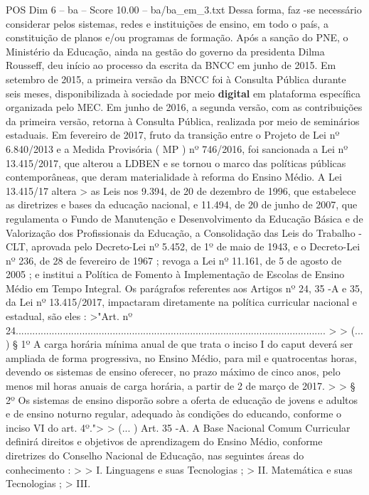 \begin{textsample}{POS Dim 6 – ba – Score 10.00 – ba/ba\_em\_3.txt}
Dessa forma, faz -se necessário considerar pelos sistemas, redes e instituições de ensino, em todo o país, a constituição de planos e/ou programas de formação.
Após a sanção do PNE, o Ministério da Educação, ainda na gestão do governo da presidenta Dilma Rousseff, deu início ao processo da escrita da BNCC em junho de 2015.
Em setembro de 2015, a primeira versão da BNCC foi à Consulta Pública durante seis meses, disponibilizada à sociedade por meio \textbf{digital} em plataforma específica organizada pelo MEC.
Em junho de 2016, a segunda versão, com as contribuições da primeira versão, retorna à Consulta Pública, realizada por meio de seminários estaduais.
Em fevereiro de 2017, fruto da transição entre o Projeto de Lei nº 6.840/2013 e a Medida Provisória ( MP ) nº 746/2016, foi sancionada a Lei nº 13.415/2017, que alterou a LDBEN e se tornou o marco das políticas públicas contemporâneas, que deram materialidade à reforma do Ensino Médio.
A Lei 13.415/17 altera > as Leis nos 9.394, de 20 de dezembro de 1996, que estabelece as diretrizes e bases da educação nacional, e 11.494, de 20 de junho de 2007, que regulamenta o Fundo de Manutenção e Desenvolvimento da Educação Básica e de Valorização dos Profissionais da Educação, a Consolidação das Leis do Trabalho - CLT, aprovada pelo Decreto-Lei nº 5.452, de 1º de maio de 1943, e o Decreto-Lei nº 236, de 28 de fevereiro de 1967 ; revoga a Lei nº 11.161, de 5 de agosto de 2005 ; e institui a Política de Fomento à Implementação de Escolas de Ensino Médio em Tempo Integral.
Os parágrafos referentes aos Artigos nº 24, 35 -A e 35, da Lei nº 13.415/2017, impactaram diretamente na política curricular nacional e estadual, são eles : >"Art. nº 24................................................................................................................ > > (... ) § 1º A carga horária mínima anual de que trata o inciso I do caput deverá ser ampliada de forma progressiva, no Ensino Médio, para mil e quatrocentas horas, devendo os sistemas de ensino oferecer, no prazo máximo de cinco anos, pelo menos mil horas anuais de carga horária, a partir de 2 de março de 2017. > > § 2º Os sistemas de ensino disporão sobre a oferta de educação de jovens e adultos e de ensino noturno regular, adequado às condições do educando, conforme o inciso VI do art. 4º."> > (... ) Art. 35 -A.
A Base Nacional Comum Curricular definirá direitos e objetivos de aprendizagem do Ensino Médio, conforme diretrizes do Conselho Nacional de Educação, nas seguintes áreas do conhecimento : > > I.
Linguagens e suas Tecnologias ; > II.
Matemática e suas Tecnologias ; > III.

\end{textsample}
